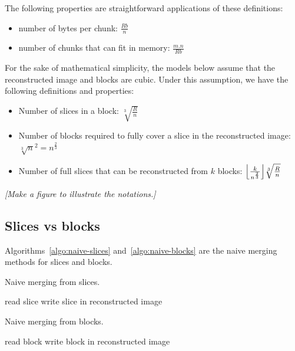 \documentclass[10pt, conference, compsocconf]{IEEEtran}
\DeclarePairedDelimiter{\floor}{\lfloor}{\rfloor}
\newcommand{\todo}[1]{
  \color{red}\emph{[#1]}
  \color{black}
}
\begin{document}
The following properties are straightforward applications of these
definitions:
\begin{itemize}
\item number of bytes per chunk: $\frac{Rb}{n}$
\item number of chunks that can fit in memory: $\frac{m.n}{Rb}$
\end{itemize}
For the sake of mathematical simplicity, the models below assume that
the reconstructed image and blocks are cubic. Under this assumption,
we have the following definitions and properties:
\begin{itemize}
\item Number of slices in a block: $\sqrt[3]{\frac{R}{n}}$
\item Number of blocks required to fully cover a slice in the
  reconstructed image: $\sqrt[3]{n}^2=n^{\frac{2}{3}}$
  \item Number of full slices that can be reconstructed from $k$
    blocks: $\floor*{\frac{k}{n^{\frac{2}{3}}}}\sqrt[3]{\frac{R}{n}}$
\end{itemize}
\todo{Make a figure to illustrate the notations.}

\subsection{Slices vs blocks}

Algorithms~\ref{algo:naive-slices} and~\ref{algo:naive-blocks} are the
naive merging methods for slices and blocks.
\begin{algorithm}[h]
\caption{Naive merging from slices.}
\label{algo:naive-slices} 
\begin{algorithmic}
    \STATE read slice
    \STATE write slice in reconstructed image
  \ENDFOR      
\end{algorithmic}
\end{algorithm}

\begin{algorithm}[h]
\caption{Naive merging from blocks.}
\label{algo:naive-blocks}
\begin{algorithmic}
    \STATE read block
    \STATE write block in reconstructed image
  \ENDFOR 
\end{algorithmic}
\end{algorithm}
\end{document}
